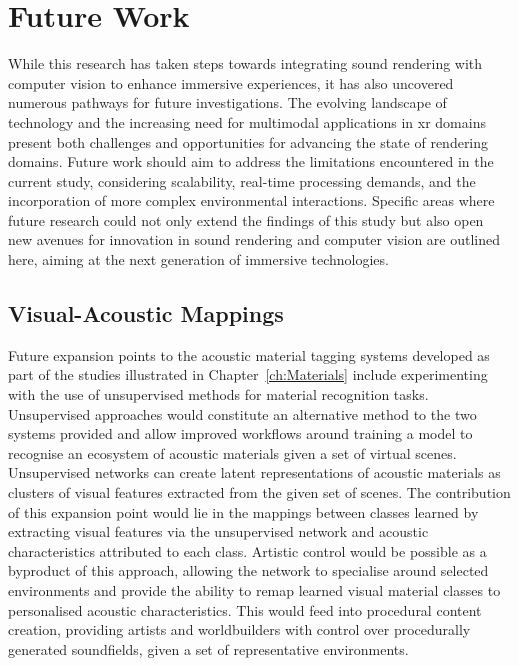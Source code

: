 \section{Future Work}
While this research has taken steps towards integrating sound rendering with computer vision to enhance immersive experiences, it has also uncovered numerous pathways for future investigations. The evolving landscape of technology and the increasing need for multimodal applications in \acrshort{xr} domains present both challenges and opportunities for advancing the state of rendering domains. Future work should aim to address the limitations encountered in the current study, considering scalability, real-time processing demands, and the incorporation of more complex environmental interactions. Specific areas where future research could not only extend the findings of this study but also open new avenues for innovation in sound rendering and computer vision are outlined here, aiming at the next generation of immersive technologies.

\subsection{Visual-Acoustic Mappings}
Future expansion points to the acoustic material tagging systems developed as part of the studies illustrated in Chapter~\ref{ch:Materials} include experimenting with the use of unsupervised methods for material recognition tasks. Unsupervised approaches would constitute an alternative method to the two systems provided and allow improved workflows around training a model to recognise an ecosystem of acoustic materials given a set of virtual scenes. Unsupervised networks can create latent representations of acoustic materials as clusters of visual features extracted from the given set of scenes. The contribution of this expansion point would lie in the mappings between classes learned by extracting visual features via the unsupervised network and acoustic characteristics attributed to each class. Artistic control would be possible as a byproduct of this approach, allowing the network to specialise around selected environments and provide the ability to remap learned visual material classes to personalised acoustic characteristics. This would feed into procedural content creation, providing artists and worldbuilders with control over procedurally generated soundfields, given a set of representative environments.

